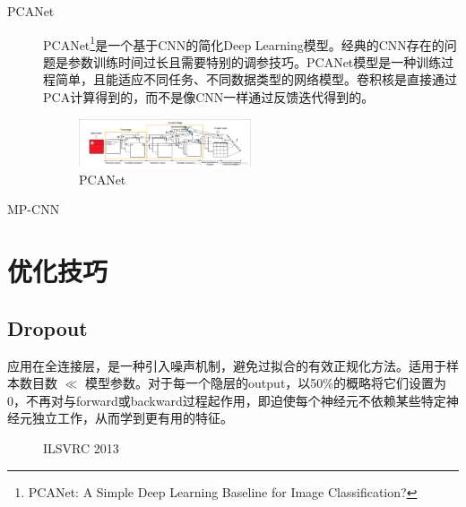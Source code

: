 \documentclass[12pt]{article}
\begin{document}
\begin{description}
\item[PCANet] PCANet\footnote{PCANet: A Simple Deep Learning Baseline for Image Classification?}是一个基于CNN的简化Deep Learning模型。经典的CNN存在的问题是参数训练时间过长且需要特别的调参技巧。PCANet模型是一种训练过程简单，且能适应不同任务、不同数据类型的网络模型。卷积核是直接通过PCA计算得到的，而不是像CNN一样通过反馈迭代得到的。
\begin{figure}[!ht]
\centering
\includegraphics[width=0.5\textwidth]{PCANet}
\caption{PCANet}
\end{figure}

\item[MP-CNN]  
\end{description}

\section{优化技巧}
\subsection{Dropout}
应用在全连接层，是一种引入噪声机制，避免过拟合的有效正规化方法。适用于样本数目数 $\ll$ 模型参数。对于每一个隐层的output，以50\%的概略将它们设置为0，不再对与forward或backward过程起作用，即迫使每个神经元不依赖某些特定神经元独立工作，从而学到更有用的特征。
\begin{figure}[!ht]
  \centering 
  \caption{ILSVRC 2013}
\end{figure}
\end{document}
